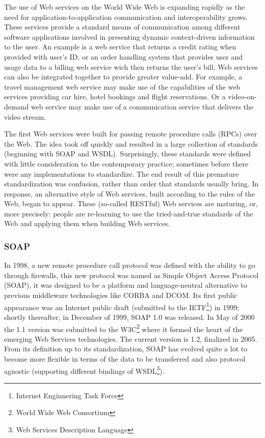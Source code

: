 The use of Web services on the World Wide Web is expanding rapidly as the need for application-to-application communication and interoperability grows. These services provide a standard means of communication among different software applications involved in presenting dynamic context-driven information to the user\cite{Austin:2004}. An example is a web service that returns a credit rating when provided with user's ID, or an order handling system that provides user and usage data to a billing web service wich then returns the user's bill. Web services can also be integrated together to provide greater value-add. For example, a travel management web service may make use of the capabilities of the web services providing car hire, hotel bookings and flight reservations. Or a video-on-demand web service may make use of a communication service that delivers the video stream.

The first Web services were built for passing remote procedure calls (RPCs) over the Web. The idea took off quickly and resulted in a large collection of standards (beginning with SOAP and WSDL). Surprisingly, these standards were defined with little consideration to the contemporary practice; sometimes before there were any implementations to standardize. The end result of this premature standardization was confusion, rather than order that standards usually bring. In response, an alternative style of Web services, built according to the rules of the Web, began to appear. These (so-called RESTful) Web services are maturing, or, more precisely: people are re-learning to use the tried-and-true standards of the Web and applying them when building Web services.

\subsubsection{SOAP}
In 1998, a new remote procedure call protocol was defined with the ability to go through firewalls, this new protocol was named as Simple Object Access Protocol (SOAP), it was designed to be a platform and language-neutral alternative to previous middleware technologies like CORBA and DCOM. Its first public appearance was an Internet public draft (submitted to the IETF\footnote{Internet Enginnering Task Force}) in 1999; shortly thereafter, in December of 1999, SOAP 1.0 was released. In May of 2000 the 1.1 version was submitted to the W3C\footnote{World Wide Web Consortium} where it formed the heart of the emerging Web Services technologies. The current version is 1.2, finalized in 2005. From its definition up to its standardization, SOAP has evolved quite a lot to become more flexible in terms of the data to be transferred and also protocol agnostic (supporting different bindings of WSDL\footnote{Web Services Description Language})\cite{Pautasso:2007}.

